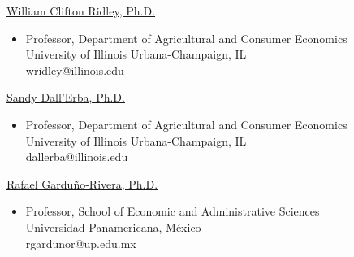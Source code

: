 \documentclass[11pt]{article}
\newenvironment{innerlist}[1][\enskip\textbullet]%
        {\begin{itemize}[#1,leftmargin=*,parsep=0pt,itemsep=0pt,topsep=0pt,partopsep=0pt]}
        {\end{itemize}}
\newcommand{\halfblankline}{\quad\vspace{-0.5\baselineskip}\pagebreak[3]}
\begin{document}
\href{https://ace.illinois.edu/directory/wridley}
{William Clifton Ridley, Ph.D.}
\begin{innerlist}
    \item[] Professor, Department of Agricultural and Consumer Economics \\
            University of Illinois Urbana-Champaign, IL \\
	        wridley@illinois.edu
\end{innerlist}
\halfblankline

\href{https://ace.illinois.edu/directory/dallerba}
{Sandy Dall'Erba, Ph.D.}
\begin{innerlist}
	\item[] Professor, Department of Agricultural and Consumer Economics \\
	University of Illinois Urbana-Champaign, IL \\
	dallerba@illinois.edu
\end{innerlist}
\halfblankline

\href{https://scholar.google.com/citations?user=Ju4Y-EwAAAAJ&hl=en}
{Rafael Garduño-Rivera, Ph.D.}
\begin{innerlist}
	\item[] Professor, School of Economic and Administrative Sciences \\ 
	Universidad Panamericana, México \\
	rgardunor@up.edu.mx
\end{innerlist}
\halfblankline


\end{document}
